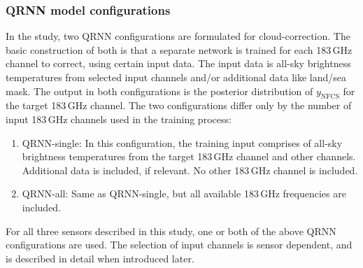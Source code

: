 \documentclass[amt, manuscript]{copernicus}
\newcommand{\ynfcs}{y_\text{NFCS}}
\begin{document}
\subsubsection{QRNN model configurations}
%
\label{sec:QRNN_configuration}
In the study, two QRNN configurations are formulated for cloud-correction. The
basic construction of both is that a separate network is trained for each
183\,GHz channel to correct, using certain input data. The input data is all-sky brightness temperatures from selected input channels and/or additional data like land/sea mask. The
output in both configurations is the posterior distribution of $\ynfcs$ for
the target 183\,GHz channel. The two configurations differ only by the number of
input 183\,GHz channels used in the training process:

\begin{enumerate}
	\item QRNN-single: In this configuration, the training input comprises of  all-sky brightness temperatures from the target 183\,GHz channel and other channels. Additional data is included, if relevant. No other 183\,GHz channel is included.  
	
	\item QRNN-all: Same as QRNN-single, but all available 183\,GHz frequencies are included.      
\end{enumerate}

For all three sensors described in this study, one or both of the above QRNN configurations are used. The selection of input channels is sensor dependent, and is described in detail when introduced later.  
\end{document}
